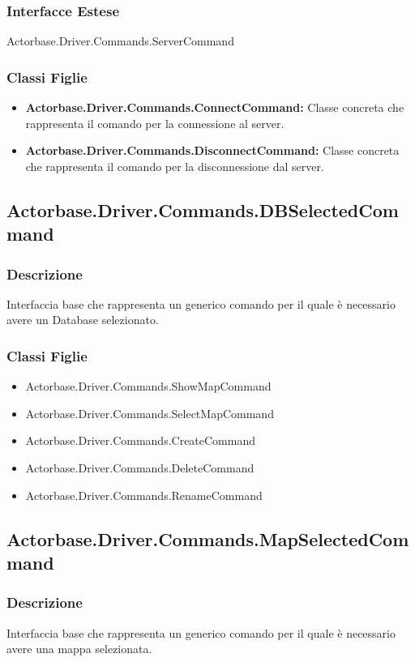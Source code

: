 \documentclass[a4paper]{article}
\begin{document}
			\subsubsection{Interfacce Estese} Actorbase.Driver.Commands.ServerCommand
			\subsubsection{Classi Figlie}
				\begin{itemize}
					\item \textbf{Actorbase.Driver.Commands.ConnectCommand:}
						Classe concreta che rappresenta il comando per la connessione al server.
					\item \textbf{Actorbase.Driver.Commands.DisconnectCommand:}
						Classe concreta che rappresenta il comando per la disconnessione dal server.
				\end{itemize}
		
		\subsection{Actorbase.Driver.Commands.DBSelectedCommand}
				\subsubsection{Descrizione} Interfaccia base che rappresenta un generico comando per il quale è necessario avere un Database selezionato.
				\subsubsection{Classi Figlie}
					\begin{itemize}
						\item Actorbase.Driver.Commands.ShowMapCommand
						\item Actorbase.Driver.Commands.SelectMapCommand
						\item Actorbase.Driver.Commands.CreateCommand
						\item Actorbase.Driver.Commands.DeleteCommand
						\item Actorbase.Driver.Commands.RenameCommand
					\end{itemize}


		\subsection{Actorbase.Driver.Commands.MapSelectedCommand}
				\subsubsection{Descrizione} Interfaccia base che rappresenta un generico comando per il quale è necessario avere una mappa selezionata.
\end{document}
